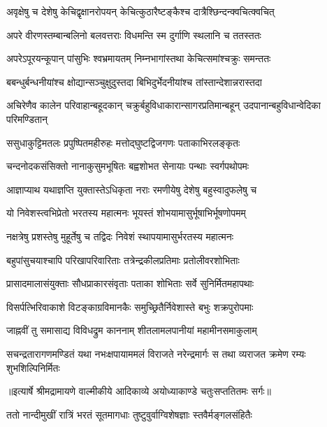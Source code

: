 \twolineshloka
{अवृक्षेषु च देशेषु केचिद्वृक्षानरोपयन्}
{केचित्कुठारैष्टङ्कैश्च दात्रैश्छिन्दन्क्वचित्क्वचित्} %

\twolineshloka
{अपरे वीरणस्तम्बान्बलिनो बलवत्तराः}
{विधमन्ति स्म दुर्गाणि स्थलानि च ततस्ततः} %

\twolineshloka
{अपरेऽपूरयन्कूपान् पांसुभिः श्वभ्रमायतम्}
{निम्नभागांस्तथा केचित्समांश्चक्रुः समन्ततः} %

\twolineshloka
{बबन्धुर्बन्धनीयांश्च क्षोद्यान्सञ्चुक्षुदुस्तदा}
{बिभिदुर्भेदनीयांश्च तांस्तान्देशान्नरास्तदा} %

\threelineshloka
{अचिरेणैव कालेन परिवाहान्बहूदकान्}
{चक्रुर्बहुविधाकारान्सागरप्रतिमान्बहून्}
{उदपानान्बहुविधान्वेदिका परिमण्डितान्} %

\twolineshloka
{ससुधाकुट्टिमतलः प्रपुष्पितमहीरुहः}
{मत्तोद्घुष्टद्विजगणः पताकाभिरलङ्कृतः} %

\twolineshloka
{चन्दनोदकसंसिक्तो नानाकुसुमभूषितः}
{बह्वशोभत सेनायाः पन्थाः स्वर्गपथोपमः} %

\twolineshloka
{आज्ञाप्याथ यथाज्ञप्ति युक्तास्तेऽधिकृता नराः}
{रमणीयेषु देशेषु बहुस्वादुफलेषु च} %

\twolineshloka
{यो निवेशस्त्वभिप्रेतो भरतस्य महात्मनः}
{भूयस्तं शोभयामासुर्भूषाभिर्भूषणोपमम्} %

\twolineshloka
{नक्षत्रेषु प्रशस्तेषु मुहूर्तेषु च तद्विदः}
{निवेशं स्थापयामासुर्भरतस्य महात्मनः} %

\twolineshloka
{बहुपांसुचयाश्चापि परिखापरिवारिताः}
{तत्रेन्द्रकीलप्रतिमाः प्रतोलीवरशोभिताः} %

\twolineshloka
{प्रासादमालासंयुक्ताः सौधप्राकारसंवृताः}
{पताका शोभिताः सर्वे सुनिर्मितमहापथाः} %

\twolineshloka
{विसर्पत्भिरिवाकाशे विटङ्काग्रविमानकैः}
{समुच्छ्रितैर्निवेशास्ते बभुः शक्रपुरोपमाः} %

\twolineshloka
{जाह्नवीं तु समासाद्य विविधद्रुम काननाम्}
{शीतलामलपानीयां महामीनसमाकुलाम्} %

\fourlineindentedshloka
{सचन्द्रतारागणमण्डितं यथा}
{नभःक्षपायाममलं विराजते}
{नरेन्द्रमार्गः स तथा व्यराजत}
{क्रमेण रम्यः शुभशिल्पिनिर्मितः} %


{॥इत्यार्षे श्रीमद्रामायणे वाल्मीकीये आदिकाव्ये अयोध्याकाण्डे चतुःसप्ततितमः सर्गः॥}


\twolineshloka
{ततो नान्दीमुखीं रात्रिं भरतं सूतमागधाः}
{तुष्टुवुर्वाग्विशेषज्ञाः स्तवैर्मङ्गलसंहितैः} %

